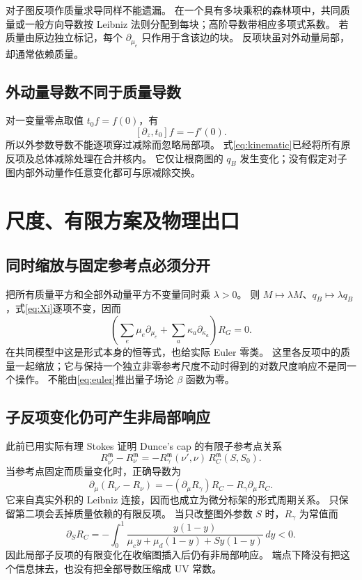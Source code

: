 \documentclass[11pt,a4paper]{ctexart}
\theoremstyle{cnplain}
\theoremstyle{remark}\newtheorem{remark}[theorem]{注}
\begin{document}
对子图反项作质量求导同样不能遗漏。
在一个具有多块乘积的森林项中，共同质量或一般方向导数按 Leibniz 法则分配到每块；高阶导数带相应多项式系数。
若质量由原边独立标记，每个 $\partial_{\mu_e}$ 只作用于含该边的块。
反项块虽对外动量局部，却通常依赖质量。

\subsection{外动量导数不同于质量导数}
对一变量零点取值 $t_0f=f(0)$，有
\begin{equation}\label{eq:kincommutator}
 [\partial_z,t_0]f=-f'(0).
\end{equation}
所以外参数导数不能逐项穿过减除而忽略局部项。
式\eqref{eq:kinematic}已经将所有原反项及总体减除处理在合并核内。
它仅让根商图的 $q_B$ 发生变化；没有假定对子图内部外动量作任意变化都可与原减除交换。

\section{尺度、有限方案及物理出口}
\subsection{同时缩放与固定参考点必须分开}
把所有质量平方和全部外动量平方不变量同时乘 $\lambda>0$。
则 $M\mapsto\lambda M$、$q_B\mapsto\lambda q_B$，式\eqref{eq:Xi}逐项不变，因而
\begin{equation}\label{eq:euler}
 \left(\sum_e\mu_e\partial_{\mu_e}
              +\sum_a\kappa_a\partial_{\kappa_a}\right)R_G=0.
\end{equation}
在共同模型中这是形式本身的恒等式，也给实际 Euler 零类。
这里各反项中的质量一起缩放；它与保持一个独立非零参考尺度不动时得到的对数尺度响应不是同一个操作。
不能由\eqref{eq:euler}推出量子场论 $\beta$ 函数为零。

\subsection{子反项变化仍可产生非局部响应}
此前已用实际有理 Stokes 证明 Dunce's cap 的有限子参考点关系
\begin{equation}\label{eq:scheme}
 R_{\nu'}^{\mathfrak m}-R_\nu^{\mathfrak m}
   =-R_\gamma^{\mathfrak m}(\nu',\nu)\,
                         R_C^{\mathfrak m}(S,S_0).
\end{equation}
当参考点固定而质量变化时，正确导数为
\begin{equation}\label{eq:schemederivative}
 \partial_\mu(R_{\nu'}-R_\nu)
 =-(\partial_\mu R_\gamma)R_C
                        -R_\gamma\partial_\mu R_C.
\end{equation}
它来自真实外积的 Leibniz 连接，因而也成立为微分标架的形式周期关系。
只保留第二项会丢掉质量依赖的有限反项。
当只改整图外参数 $S$ 时，$R_\gamma$ 为常值而
\[
 \partial_SR_C=-\int_0^1
       \frac{y(1-y)}{\mu_cy+\mu_d(1-y)+S y(1-y)}\,dy<0.
\]
因此局部子反项的有限变化在收缩图插入后仍有非局部响应。
端点下降没有把这个信息抹去，也没有把全部导数压缩成 UV 常数。
\end{document}
